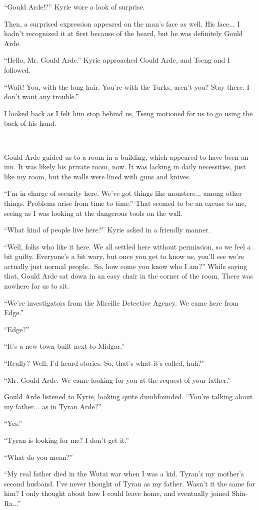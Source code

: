 \documentclass[oneside]{book}
\begin{document}
“Gould Arde!?” Kyrie wore a look of surprise.

Then, a surprised expression appeared on the man’s face as well. His face... I hadn’t recognized it at first because of the beard, but he was definitely Gould Arde.

“Hello, Mr. Gould Arde.” Kyrie approached Gould Arde, and Tseng and I followed.

“Wait! You, with the long hair. You’re with the Turks, aren’t you? Stay there. I don’t want any trouble.”

I looked back as I felt him stop behind us, Tseng motioned for us to go using the back of his hand.

–

Gould Arde guided us to a room in a building, which appeared to have been an inn. It was likely his private room, now. It was lacking in daily necessities, just like my room, but the walls were lined with guns and knives.

“I’m in charge of security here. We’ve got things like monsters... among other things. Problems arise from time to time.” That seemed to be an excuse to me, seeing as I was looking at the dangerous tools on the wall.

“What kind of people live here?” Kyrie asked in a friendly manner.

“Well, folks who like it here. We all settled here without permission, so we feel a bit guilty. Everyone’s a bit wary, but once you get to know us, you’ll see we’re actually just normal people.. So, how come you know who I am?” While saying that, Gould Arde sat down in an easy chair in the corner of the room. There was nowhere for us to sit.

“We’re investigators from the Mireille Detective Agency. We came here from Edge.”

“Edge?”

“It’s a new town built next to Midgar.”

“Really? Well, I’d heard stories. So, that’s what it’s called, huh?”

“Mr. Gould Arde. We came looking for you at the request of your father.”

Gould Arde listened to Kyrie, looking quite dumbfounded. “You’re talking about my father... as in Tyran Arde?”

“Yes.”

“Tyran is looking for me? I don’t get it.”

“What do you mean?”

“My real father died in the Wutai war when I was a kid. Tyran’s my mother’s second husband. I’ve never thought of Tyran as my father. Wasn’t it the same for him? I only thought about how I could leave home, and eventually joined Shin-Ra...”
\end{document}
